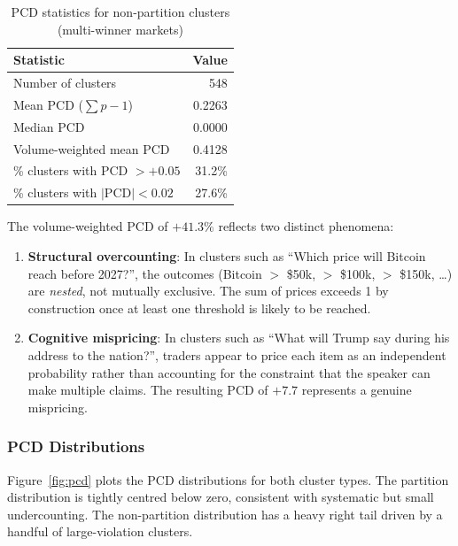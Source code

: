 \documentclass[12pt,a4paper]{article}
\theoremstyle{definition}
\theoremstyle{remark}
\begin{document}
\begin{table}[H]
\centering
\caption{PCD statistics for non-partition clusters (multi-winner markets)}
\label{tab:pcd_nonpartition}
\begin{tabular}{lr}
\toprule
\textbf{Statistic} & {\textbf{Value}} \\
\midrule
Number of clusters                     & 548 \\
Mean PCD ($\sum p - 1$)                & 0.2263 \\
Median PCD                             & 0.0000 \\
Volume-weighted mean PCD               & 0.4128 \\
\midrule
\% clusters with PCD $> +0.05$         & 31.2\% \\
\% clusters with $|\text{PCD}| < 0.02$ & 27.6\% \\
\bottomrule
\end{tabular}
\end{table}

The volume-weighted PCD of $+41.3\%$ reflects two distinct phenomena:
\begin{enumerate}[label=(\arabic*)]
  \item \textbf{Structural overcounting}: In clusters such as
    ``Which price will Bitcoin reach before 2027?'', the outcomes
    (Bitcoin $>$ \$50k, $>$ \$100k, $>$ \$150k, \ldots) are \emph{nested},
    not mutually exclusive. The sum of prices exceeds 1 by construction once
    at least one threshold is likely to be reached.
  \item \textbf{Cognitive mispricing}: In clusters such as
    ``What will Trump say during his address to the nation?'', traders
    appear to price each item as an independent probability rather than
    accounting for the constraint that the speaker can make multiple claims.
    The resulting PCD of $+7.7$ represents a genuine mispricing.
\end{enumerate}

\subsubsection{PCD Distributions}

Figure~\ref{fig:pcd} plots the PCD distributions for both cluster types.
The partition distribution is tightly centred below zero, consistent with
systematic but small undercounting.
The non-partition distribution has a heavy right tail driven by a handful
of large-violation clusters.
\end{document}

